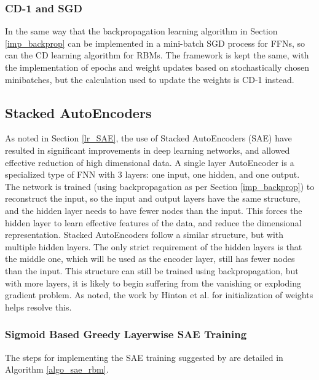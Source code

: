 \documentclass[a4paper,11pt,oneside]{article}
\theoremstyle{plain}
\theoremstyle{definition}
\begin{document}
	\subsubsection{CD-1 and SGD}
	
	In the same way that the backpropagation learning algorithm in Section \ref{imp_backprop} can be implemented in a mini-batch SGD process for FFNs, so can the CD learning algorithm for RBMs. The framework is kept the same, with the implementation of epochs and weight updates based on stochastically chosen minibatches, but the calculation used to update the weights is CD-1 instead.
	
	
	\subsection{Stacked AutoEncoders}\label{imp_SAE}
	
	As noted in Section \ref{lr_SAE}, the use of Stacked AutoEncoders (SAE) have resulted in significant improvements in deep learning networks, and allowed effective reduction of high dimensional data. A single layer AutoEncoder is a specialized type of FNN with 3 layers: one input, one hidden, and one output. The network is trained (using backpropagation as per Section \ref{imp_backprop}) to reconstruct the input, so the input and output layers have the same structure, and the hidden layer needs to have fewer nodes than the input. This forces the hidden layer to learn effective features of the data, and reduce the dimensional representation. 
	\newline\newline
	Stacked AutoEncoders follow a similar structure, but with multiple hidden layers. The only strict requirement of the hidden layers is that the middle one, which will be used as the encoder layer, still has fewer nodes than the input. This structure can still be trained using backpropagation, but with more layers, it is likely to begin suffering from the vanishing or exploding gradient problem. As noted, the work by Hinton et al. for initialization of weights helps resolve this.
	
	\subsubsection{Sigmoid Based Greedy Layerwise SAE Training}\label{imp_sigmoidsae}
	
	The steps for implementing the SAE training suggested by \citet{Hinton2} are detailed in Algorithm \ref{algo_sae_rbm}.\newline
	
\end{document}

